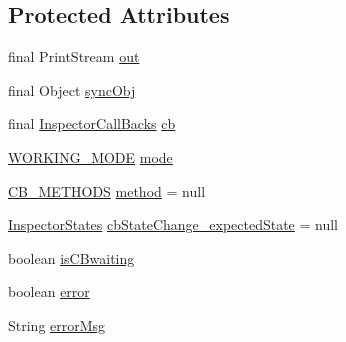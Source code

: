 \subsection*{Protected Attributes}
\begin{DoxyCompactItemize}
\item 
final Print\+Stream \hyperlink{classgov_1_1nasa_1_1jpf_1_1inspector_1_1client_1_1_callback_execution_decorator_a30138942cde8b1d228acac772187354c}{out}
\item 
final Object \hyperlink{classgov_1_1nasa_1_1jpf_1_1inspector_1_1client_1_1_callback_execution_decorator_a44534c6f15095fc46c7e6cddc7e379da}{sync\+Obj}
\item 
final \hyperlink{interfacegov_1_1nasa_1_1jpf_1_1inspector_1_1interfaces_1_1_inspector_call_backs}{Inspector\+Call\+Backs} \hyperlink{classgov_1_1nasa_1_1jpf_1_1inspector_1_1client_1_1_callback_execution_decorator_a3368e5a926aa09b3c9bd244ee790f3f3}{cb}
\item 
\hyperlink{enumgov_1_1nasa_1_1jpf_1_1inspector_1_1client_1_1_callback_execution_decorator_1_1_w_o_r_k_i_n_g___m_o_d_e}{W\+O\+R\+K\+I\+N\+G\+\_\+\+M\+O\+DE} \hyperlink{classgov_1_1nasa_1_1jpf_1_1inspector_1_1client_1_1_callback_execution_decorator_a1c94b5ff8b41a0d4fc5d6d872c2f20be}{mode}
\item 
\hyperlink{enumgov_1_1nasa_1_1jpf_1_1inspector_1_1interfaces_1_1_inspector_call_backs_1_1_c_b___m_e_t_h_o_d_s}{C\+B\+\_\+\+M\+E\+T\+H\+O\+DS} \hyperlink{classgov_1_1nasa_1_1jpf_1_1inspector_1_1client_1_1_callback_execution_decorator_a4c6a37dec58589fdd22ea4786d73752d}{method} = null
\item 
\hyperlink{enumgov_1_1nasa_1_1jpf_1_1inspector_1_1interfaces_1_1_commands_interface_1_1_inspector_states}{Inspector\+States} \hyperlink{classgov_1_1nasa_1_1jpf_1_1inspector_1_1client_1_1_callback_execution_decorator_a300944aa979608f761bf4061da40f587}{cb\+State\+Change\+\_\+expected\+State} = null
\item 
boolean \hyperlink{classgov_1_1nasa_1_1jpf_1_1inspector_1_1client_1_1_callback_execution_decorator_a9cd61044a240cd1c002cc70397457b9b}{is\+C\+Bwaiting}
\item 
boolean \hyperlink{classgov_1_1nasa_1_1jpf_1_1inspector_1_1client_1_1_callback_execution_decorator_a70e054c25db8a40468c6fea73ad2ea22}{error}
\item 
String \hyperlink{classgov_1_1nasa_1_1jpf_1_1inspector_1_1client_1_1_callback_execution_decorator_a4e28619ff9db004a84b9186e9b171332}{error\+Msg}
\end{DoxyCompactItemize}
